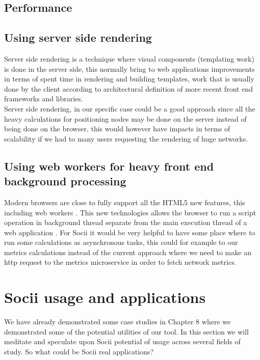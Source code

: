 \subsection{Performance}

\subsection*{Using server side rendering}
Server side rendering is a technique where visual components (templating work) is done in the server side, this normally bring to web applications improvements in terms of spent time in rendering and building templates, work that is usually done by the client according to architectural definition of more recent front end frameworks and libraries.\\
\indent Server side rendering, in our specific case could be a good approach since all the heavy calculations for positioning nodes
may be done on the server instead of being done on the browser, this would however have impacts in terms of scalability if we had to many users requesting
the rendering of huge networks.

\subsection*{Using web workers for heavy front end background processing}
Modern browsers are close to fully support all the HTML5 new features, this including web workers \citep{webworkers}. This new technologies allows
the browser to run a script operation in background thread separate from the main execution thread of a web application \citep{mdnwebworkers}. For Socii it would be very helpful to have some place where to run some calculations as asynchronous tasks, this could for example to our metrics calculations instead of the current approach where we need to make an http request to the metrics microservice in order to fetch network metrics.

\section{Socii usage and applications}
We have already demonstrated some case studies in Chapter 8 where we demonstrated some of the potential utilities of our tool. In this section we will meditate and speculate upon Socii potential of usage across several fields of study. So what could be Socii real applications?

